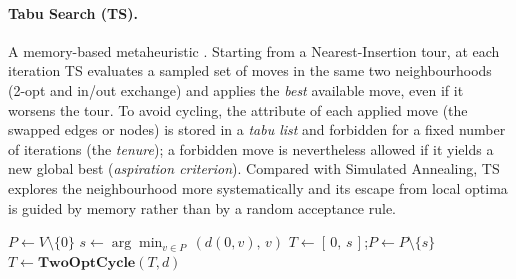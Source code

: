\documentclass[conference]{IEEEtran}
\begin{document}
\paragraph{Tabu Search (TS).}
A memory-based metaheuristic \cite{glover1986,gloverlaguna1997,knox1994}. Starting from a Nearest-Insertion tour, at each iteration TS evaluates a sampled set of moves in the same two neighbourhoods (2-opt and in/out exchange) and applies the \emph{best} available move, even if it worsens the tour. To avoid cycling, the attribute of each applied move (the swapped edges or nodes) is stored in a \emph{tabu list} and forbidden for a fixed number of iterations (the \emph{tenure}); a forbidden move is nevertheless allowed if it yields a new global best (\emph{aspiration criterion}). Compared with Simulated Annealing, TS explores the neighbourhood more systematically and its escape from local optima is guided by memory rather than by a random acceptance rule.

\FloatBarrier
\begin{algorithm}[t]
\small
\DontPrintSemicolon
{}
\SetInd{0.5em}{0.8em}
\caption{DCIH (Deterministic Cheapest-Insertion Heuristic) for the $k$-TSP}\label{alg:dci}


$P \leftarrow V\setminus\{0\}$\;
$s \leftarrow \arg\min_{v\in P}\,(d(0,v),\,v)$ 
$T \leftarrow [\,0,\,s\,]$;\quad $P\leftarrow P\setminus\{s\}$\;
$T \leftarrow \textbf{TwoOptCycle}(T,d)$\;
\;
\end{algorithm}
\FloatBarrier
\end{document}
